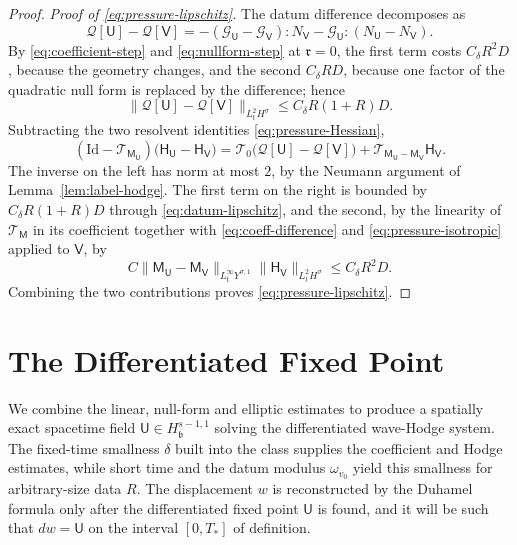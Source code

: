 \documentclass[11pt,reqno]{amsart}
\theoremstyle{plain}
\theoremstyle{definition}
\theoremstyle{remark}
\numberwithin{equation}{section}
\newcommand{\breg}{\mathfrak b}
\newcommand{\rpar}{\mathfrak r}
\newcommand{\Ufield}{\mathsf U}
\newcommand{\Mmat}{\mathsf M}
\newcommand{\Ccoef}{\mathcal G}   %
\newcommand{\Hess}{\mathsf H}     %
\newcommand{\Vfield}{\mathsf V}
\begin{document}
\begin{proof}
\emph{Proof of \eqref{eq:pressure-lipschitz}.}  The datum difference
decomposes as
\begin{equation}\label{eq:datum-difference-decomposition}
 \mathcal Q[\Ufield]-\mathcal Q[\Vfield]
 =-(\Ccoef_{\Ufield}-\Ccoef_{\Vfield}):N_{\Vfield}
   -\Ccoef_{\Ufield}:(N_{\Ufield}-N_{\Vfield}) .
\end{equation}
By \eqref{eq:coefficient-step} and \eqref{eq:nullform-step} at $\rpar=0$, the
first term costs $C_\delta R^2D$, because the geometry changes, and the
second $C_\delta RD$, because one factor of the quadratic null form is
replaced by the difference; hence
\begin{equation}\label{eq:datum-lipschitz}
 \|\mathcal Q[\Ufield]-\mathcal Q[\Vfield]\|_{L^2_tH^\sigma}
 \le C_\delta R(1+R)D .
\end{equation}
Subtracting the two resolvent identities \eqref{eq:pressure-Hessian},
\[
 (\mathrm{Id}-\mathscr T_{\Mmat_{\Ufield}})
 \big(\Hess_{\Ufield}-\Hess_{\Vfield}\big)
 =\mathscr T_0\big(\mathcal Q[\Ufield]-\mathcal Q[\Vfield]\big)
  +\mathscr T_{\Mmat_{\Ufield}-\Mmat_{\Vfield}}\Hess_{\Vfield} .
\]
The inverse on the left has norm at most $2$, by the Neumann argument of
Lemma~\ref{lem:label-hodge}.  The first term on the right is bounded by
$C_\delta R(1+R)D$ through \eqref{eq:datum-lipschitz}, and the second, by the
linearity of $\mathscr T_{\Mmat}$ in its coefficient together with
\eqref{eq:coeff-difference} and \eqref{eq:pressure-isotropic} applied to
$\Vfield$, by
\[
 C\|\Mmat_{\Ufield}-\Mmat_{\Vfield}\|_{L^\infty_tY^{\sigma,1}}
   \|\Hess_{\Vfield}\|_{L^2_tH^\sigma}
 \le C_\delta R^2D .
\]
Combining the two contributions proves \eqref{eq:pressure-lipschitz}.
\end{proof}

\section{The Differentiated Fixed Point}
\label{sec:fixedpoint}

We combine the linear, null-form and elliptic estimates to produce a
spatially exact spacetime field $\Ufield\in H^{s-1,1}_{\breg}$ solving the differentiated wave-Hodge system. The fixed-time smallness $\delta$ built into the class
supplies the coefficient and Hodge estimates, while short time and the datum
modulus $\omega_{v_0}$ yield this smallness for arbitrary-size data $R$.  The displacement $w$ is
reconstructed by the Duhamel formula only after the differentiated fixed point $\Ufield$ is found, and it will be such that $dw=\Ufield$ on the interval $[0,T_*]$ of definition.
\end{document}
